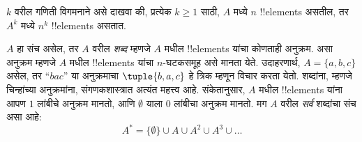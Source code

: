\documentclass[../../../include/open-logic-section]{subfiles}
\begin{document}
\begin{prob}
$k$ वरील गणिती विगमनाने असे दाखवा की, प्रत्येक $k \ge 1$ साठी,
$A$ मध्ये $n$ !!{element}s असतील, तर $A^k$ मध्ये $n^k$ !!{element}s असतात.
\end{prob}

\begin{ex}
$A$ हा संच असेल, तर $A$ वरील \emph{शब्द} म्हणजे $A$ मधील
!!{element}s यांचा कोणताही अनुक्रम.
असा अनुक्रम म्हणजे $A$ मधील !!{element}s यांचा $n$-घटकसमूह असे मानता येते.
उदाहरणार्थ, $A = \{a, b, c\}$ असेल, तर ``$bac$'' या अनुक्रमाचा
$\tuple{b, a, c}$ हे त्रिक म्हणून विचार करता येतो.
शब्दांना, म्हणजे चिन्हांच्या अनुक्रमांना, संगणकशास्त्रात अत्यंत महत्त्व आहे.
संकेतानुसार, $A$ मधील !!{element}s यांना आपण $1$ लांबीचे अनुक्रम मानतो,
आणि $\emptyset$ याला $0$ लांबीचा अनुक्रम मानतो.
मग $A$ वरील \emph{सर्व} शब्दांचा संच असा आहे:
\[
A^* = \{\emptyset\} \cup A \cup A^2 \cup A^3 \cup \dots
\]
\end{ex}
\end{document}
